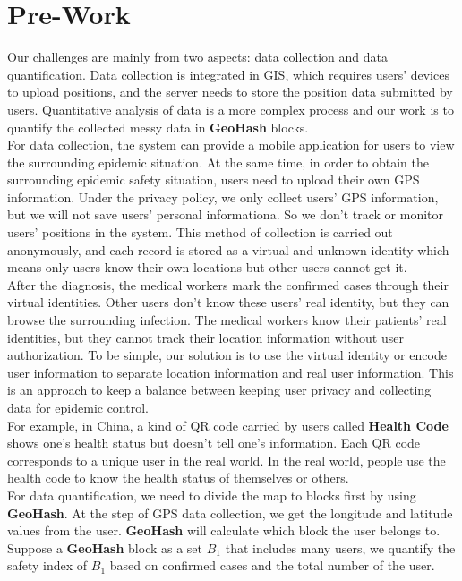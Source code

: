 \documentclass[sigplan,screen]{acmart}
\begin{document}
\section{Pre-Work}
Our challenges are mainly from two aspects: data collection and data quantification.
Data collection is integrated in GIS, which requires users' devices to upload positions, and the server needs to store the position data submitted by users.
Quantitative analysis of data is a more complex process and our work is to quantify the collected messy data in \textbf{GeoHash} blocks.
\\
For data collection, the system can provide a mobile application for users to view the surrounding epidemic situation.
At the same time, in order to obtain the surrounding epidemic safety situation, users need to upload their own GPS information.
Under the privacy policy, we only collect users' GPS information, but we will not save users' personal informationa. So we don't track or monitor users' positions in the system.
This method of collection is carried out anonymously, and each record is stored as a virtual and unknown identity which means only users know their own locations but other users cannot get it.
\\
After the diagnosis, the medical workers mark the confirmed cases through their virtual identities.
Other users don't know these users' real identity, but they can browse the surrounding infection.
The medical workers know their patients' real identities, but they cannot track their location information without user authorization.
To be simple, our solution is to use the virtual identity or encode user information to separate location information and real user information.
This is an approach to keep a balance between keeping user privacy and collecting data for epidemic control.
\\
For example, in China, a kind of QR code carried by users called \textbf{Health Code} shows one's health status but doesn't tell one's information.
Each QR code corresponds to a unique user in the real world.
In the real world, people use the health code to know the health status of themselves or others.
\\
For data quantification, we need to divide the map to blocks first by using \textbf{GeoHash}.
At the step of GPS data collection, we get the longitude and latitude values from the user.
\textbf{GeoHash} will calculate which block the user belongs to.
Suppose a \textbf{GeoHash} block as a set $B_1$ that includes many users, we quantify the safety index of $B_1$ based on confirmed cases and the total number of the user.
\end{document}
